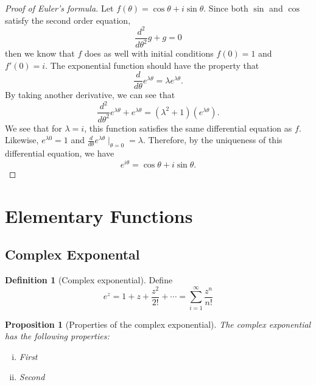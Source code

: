 \documentclass[12pt]{article}
\newtheorem{prop}[thm]{Proposition}
\theoremstyle{definition}
\newtheorem{defn}[thm]{Definition}
\theoremstyle{remark}
\numberwithin{equation}{section}
\begin{document}
\begin{proof}[Proof of Euler's formula]\leavevmode

  \noindent Let $f(\theta) = \cos\theta + i\sin\theta$. Since both $\sin$ and $\cos$ satisfy the second order equation,
  \begin{equation}
    \frac{d^2}{d\theta^2}g + g = 0
  \end{equation}
  then we know that $f$ does as well with initial conditions $f(0) = 1$ and $f'(0) = i$. The exponential function should have the property that
  \begin{equation}
    \frac{d}{d\theta} e^{\lambda \theta} = \lambda e^{\lambda \theta}.
  \end{equation}
  By taking another derivative, we can see that 
  \begin{equation} 
    \frac{d^2}{d\theta^2} e^{\lambda \theta} + e^{\lambda \theta} = (\lambda^2 + 1)(e^{\lambda \theta}).
  \end{equation}
  We see that for $\lambda = i$, this function satisfies the same differential equation as $f$. Likewise, $e^{\lambda 0} = 1$ and $\frac{d}{d\theta} e^{\lambda \theta} \mid_{\theta = 0} = \lambda$. Therefore, by the uniqueness of this differential equation, we have
  \begin{equation}  
  e^{i\theta} = \cos\theta + i\sin\theta.
  \end{equation}
\end{proof}

\section{Elementary Functions}%
\label{sec:elementary_functions}

\subsection{Complex Exponental}%
\label{sub:complex_exponental}


\begin{defn}[Complex exponential]
  Define 
  \begin{equation}
    e^z = 1 + z + \frac{z^2}{2!} + \cdots = \sum_{i=1}^{\infty}\frac{z^n}{n!}
  \end{equation}
\end{defn}

\begin{prop}[Properties of the complex exponential]

The complex exponential has the following properties:
\begin{enumerate}[(i)]
  \item First
  \item Second %
\end{enumerate}
\end{prop}
\end{document}

